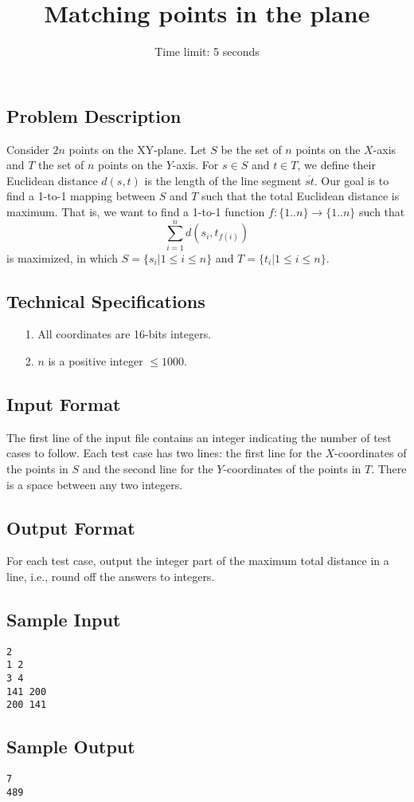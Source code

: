 \documentclass[12pt,psfig,epsf]{article}
\begin{document}
\title{\bf{Matching points in the plane} }
\author{Time limit: 5 seconds}
\date{}
\maketitle

\subsection*{Problem Description}
\hspace{0.7cm}Consider $2n$ points on the XY-plane. Let $S$ be the set of $n$ points on the $X$-axis and $T$ the set of $n$ points on the $Y$-axis. For $s\in S$ and $t\in T$, we define their Euclidean distance $d(s,t)$ is the length of the line segment $\overline{st}$.
Our goal is to find a 1-to-1 mapping between $S$ and $T$ such that the total Euclidean distance is maximum. That is, we want to find a 1-to-1 function $f:\{1..n\}\rightarrow \{1..n\}$ such that 
\[ \sum_{i=1}^{n}d(s_i,t_{f(i)}) \]
is maximized, in which $S=\{s_i|1\leq i\leq n\}$ and $T=\{t_i|1\leq i\leq n\}$.
\subsection*{Technical Specifications}
\begin{itemize}
\item[1.] All coordinates are 16-bits integers.
\item[2.] $n$ is a positive integer $\leq 1000$.
\end{itemize}
\subsection*{Input Format}
\hspace{0.7cm}The first line of the input file contains an integer
indicating the number of test cases to follow. Each test case has two lines: the first line for the $X$-coordinates of the points in $S$ and the second line for the $Y$-coordinates of the points in $T$. There is a space between any two integers.
\subsection*{Output Format}
\hspace{0.7cm}For each test case, output the integer part of the maximum total distance in a line, i.e., round off the answers to integers. 
\subsection*{Sample Input}
\begin{verbatim}
2
1 2
3 4
141 200
200 141
\end{verbatim}
\subsection*{Sample Output}
\begin{verbatim}
7
489
\end{verbatim}
\end{document}
